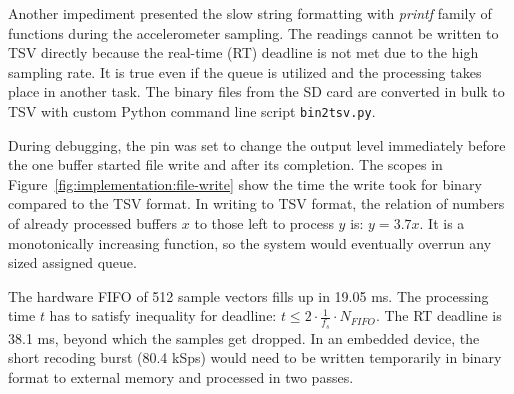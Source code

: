 Another impediment presented the slow string formatting with \emph{printf} family of functions during the accelerometer sampling. The readings cannot be written to TSV directly because the real-time (RT) deadline is not met due to the high sampling rate. It is true even if the queue is utilized and the processing takes place in another task. The binary files from the SD card are converted in bulk to TSV with custom Python command line script \verb|bin2tsv.py|.

During debugging, the pin was set to change the output level immediately before the one buffer started file write and after its completion. The scopes in Figure~\ref{fig:implementation:file-write} show the time the write took for binary compared to the TSV format. In writing to TSV format, the relation of numbers of already processed buffers $x$ to those left to process $y$ is: $y = 3.7x$. It is a monotonically increasing function, so the system would eventually overrun any sized assigned queue.

The hardware FIFO of 512 sample vectors fills up in 19.05 ms. The processing time $t$ has to satisfy inequality for deadline: $t \leq 2 \cdot \frac{1}{f_s} \cdot N_{FIFO} $. The RT deadline is 38.1 ms, beyond which the samples get dropped. In an embedded device, the short recoding burst (80.4 kSps) would need to be written temporarily in binary format to external memory and processed in two passes.

